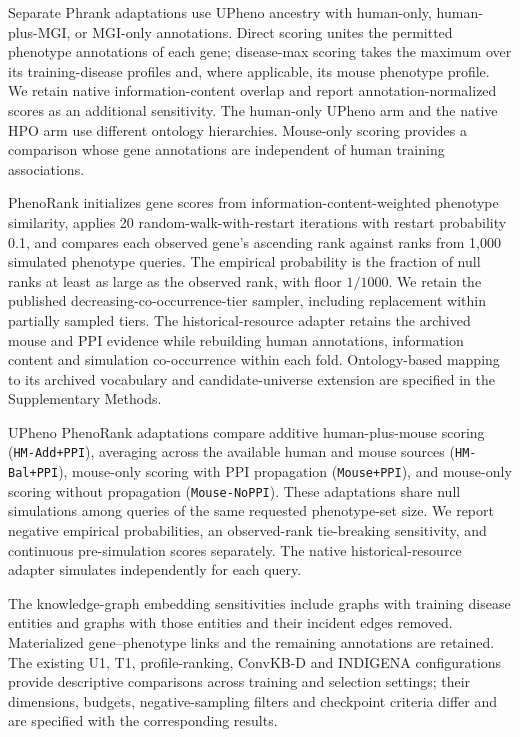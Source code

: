 \documentclass[webpdf,contemporary,large]{oup-authoring-template}%
\theoremstyle{thmstyleone}%
\theoremstyle{thmstyletwo}%
\theoremstyle{thmstylethree}%
\begin{document}
Separate Phrank adaptations use UPheno ancestry with human-only, human-plus-MGI,
or MGI-only annotations. Direct scoring unites the permitted phenotype
annotations of each gene; disease-max scoring takes the maximum over its
training-disease profiles and, where applicable, its mouse phenotype profile.
We retain native information-content overlap and report annotation-normalized
scores as an additional sensitivity. The human-only UPheno arm and the native
HPO arm use different ontology hierarchies. Mouse-only scoring provides a
comparison whose gene annotations are independent of human training associations.

PhenoRank initializes gene scores from information-content-weighted phenotype
similarity, applies 20 random-walk-with-restart iterations with restart
probability 0.1, and compares each observed gene's ascending rank against ranks
from 1{,}000 simulated phenotype queries. The empirical probability is the
fraction of null ranks at least as large as the observed rank, with floor
$1/1000$. We retain the published decreasing-co-occurrence-tier sampler,
including replacement within partially sampled tiers. The historical-resource
adapter retains the archived mouse and PPI evidence while rebuilding human
annotations, information content and simulation co-occurrence within each fold.
Ontology-based mapping to its archived vocabulary and candidate-universe
extension are specified in the Supplementary Methods.

UPheno PhenoRank adaptations compare additive human-plus-mouse scoring
(\texttt{HM-Add+PPI}), averaging across the available human and mouse sources
(\texttt{HM-Bal+PPI}), mouse-only scoring with PPI propagation
(\texttt{Mouse+PPI}), and mouse-only scoring without propagation
(\texttt{Mouse-NoPPI}). These adaptations share null simulations among queries
of the same requested phenotype-set size. We report negative empirical
probabilities, an observed-rank tie-breaking sensitivity, and continuous
pre-simulation scores separately. The native historical-resource adapter
simulates independently for each query.

The knowledge-graph embedding sensitivities include graphs with training
disease entities and graphs with those entities and their incident edges
removed. Materialized gene--phenotype links and the remaining annotations are
retained. The existing U1, T1, profile-ranking, ConvKB-D and INDIGENA
configurations provide descriptive comparisons across training and selection
settings; their dimensions, budgets, negative-sampling filters and checkpoint
criteria differ and are specified with the corresponding results.
\end{document}

